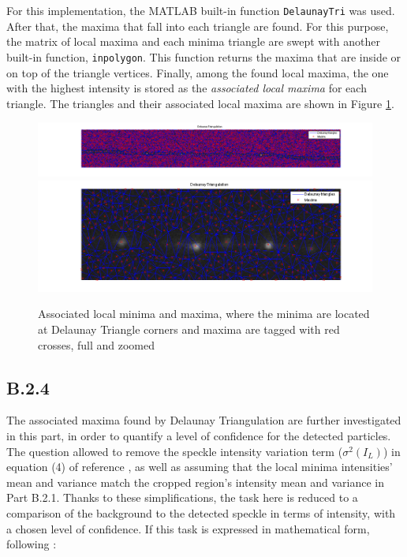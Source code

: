 \documentclass{article}
\begin{document}
For this implementation, the MATLAB built-in function \texttt{DelaunayTri} was used. After that, the maxima that fall into each triangle are found. For this purpose, the matrix of local maxima and each minima triangle are swept with another built-in function, \texttt{inpolygon}. This function returns the maxima that are inside or on top of the triangle vertices. Finally, among the found local maxima, the one with the highest intensity is stored as the \emph{associated local maxima} for each triangle. The triangles and their associated local maxima are shown in Figure \ref{fig:assocLocal}.

\begin{figure}[H]
\centering
\includegraphics[width=16cm]{figures/delaunay_full.png}
\includegraphics[width=16cm]{figures/delaunay_zoom.png}
\caption{Associated local minima and maxima, where the minima are located at Delaunay Triangle corners and maxima are tagged with red crosses, full and zoomed}
\label{fig:assocLocal}
\end{figure}



\subsection*{B.2.4}
 
The associated maxima found by Delaunay Triangulation are further investigated in this part, in order to quantify a level of confidence for the detected particles. The question allowed to remove the speckle intensity variation term ($\sigma^2(I_L)$) in equation (4) of reference \cite{ponti}, as well as assuming that the local minima intensities' mean and variance match the cropped region's intensity mean and variance in Part B.2.1. Thanks to these simplifications, the task here is reduced to a comparison of the background to the detected speckle in terms of intensity, with a chosen level of confidence. If this task is expressed in mathematical form, following \cite{ponti}:
\end{document}
